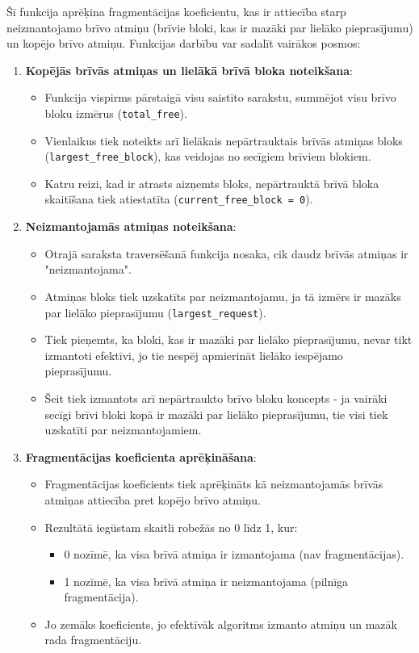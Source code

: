 \documentclass{report}
\begin{document}
	Šī funkcija aprēķina fragmentācijas koeficientu, kas ir attiecība starp neizmantojamo brīvo atmiņu (brīvie bloki, kas ir mazāki par lielāko pieprasījumu) un kopējo brīvo atmiņu. Funkcijas darbību var sadalīt vairākos posmos:
	
	\begin{enumerate}
		\item \textbf{Kopējās brīvās atmiņas un lielākā brīvā bloka noteikšana}:
		\begin{itemize}
			\item Funkcija vispirms pārstaigā visu saistīto sarakstu, summējot visu brīvo bloku izmērus (\texttt{total\_free}).
			\item Vienlaikus tiek noteikts arī lielākais nepārtrauktais brīvās atmiņas bloks (\texttt{largest\_free\_block}), kas veidojas no secīgiem brīviem blokiem.
			\item Katru reizi, kad ir atrasts aizņemts bloks, nepārtrauktā brīvā bloka skaitīšana tiek atiestatīta (\texttt{current\_free\_block = 0}).
		\end{itemize}
		
		\item \textbf{Neizmantojamās atmiņas noteikšana}:
		\begin{itemize}
			\item Otrajā saraksta traversēšanā funkcija nosaka, cik daudz brīvās atmiņas ir "neizmantojama".
			\item Atmiņas bloks tiek uzskatīts par neizmantojamu, ja tā izmērs ir mazāks par lielāko pieprasījumu (\texttt{largest\_request}).
			\item Tiek pieņemts, ka bloki, kas ir mazāki par lielāko pieprasījumu, nevar tikt izmantoti efektīvi, jo tie nespēj apmierināt lielāko iespējamo pieprasījumu.
			\item Šeit tiek izmantots arī nepārtraukto brīvo bloku koncepts - ja vairāki secīgi brīvi bloki kopā ir mazāki par lielāko pieprasījumu, tie visi tiek uzskatīti par neizmantojamiem.
		\end{itemize}
		
		\item \textbf{Fragmentācijas koeficienta aprēķināšana}:
		\begin{itemize}
			\item Fragmentācijas koeficients tiek aprēķināts kā neizmantojamās brīvās atmiņas attiecība pret kopējo brīvo atmiņu.
			\item Rezultātā iegūstam skaitli robežās no 0 līdz 1, kur:
			\begin{itemize}
				\item 0 nozīmē, ka visa brīvā atmiņa ir izmantojama (nav fragmentācijas).
				\item 1 nozīmē, ka visa brīvā atmiņa ir neizmantojama (pilnīga fragmentācija).
			\end{itemize}
			\item Jo zemāks koeficients, jo efektīvāk algoritms izmanto atmiņu un mazāk rada fragmentāciju.
		\end{itemize}
	\end{enumerate}
	
\end{document}
